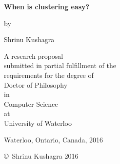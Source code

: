 
\pagestyle{empty}

\begin{titlepage}
        \begin{center}
        \vspace*{1.0cm}

        \Huge
        {\bf When is clustering easy? }

        \vspace*{1.0cm}

        \normalsize
        by \\

        \vspace*{1.0cm}

        \Large
        Shrinu Kushagra \\

        \vspace*{3.0cm}

        \normalsize
        A research proposal\\
		submitted in partial fulfillment of the\\
		requirements for the degree of\\
		Doctor of Philosophy\\
		in\\
		Computer Science\\
		at\\
		University of Waterloo\\

        \vspace*{2.0cm}

        Waterloo, Ontario, Canada, 2016 \\

        \vspace*{1.0cm}

        \copyright\ Shrinu Kushagra 2016 \\
        \end{center}
\end{titlepage}

\pagestyle{plain}
\setcounter{page}{2}

